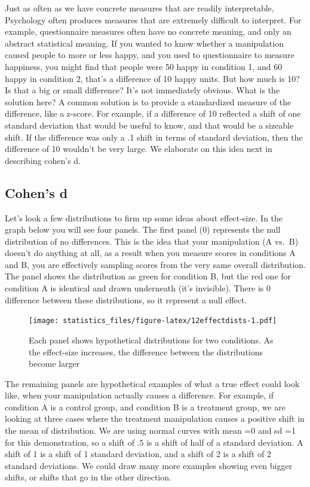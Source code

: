 \documentclass[]{book}
\begin{document}
Just as often as we have concrete measures that are readily interpretable, Psychology often produces measures that are extremely difficult to interpret. For example, questionnaire measures often have no concrete meaning, and only an abstract statistical meaning. If you wanted to know whether a manipulation caused people to more or less happy, and you used to questionnaire to measure happiness, you might find that people were 50 happy in condition 1, and 60 happy in condition 2, that's a difference of 10 happy units. But how much is 10? Is that a big or small difference? It's not immediately obvious. What is the solution here? A common solution is to provide a standardized measure of the difference, like a z-score. For example, if a difference of 10 reflected a shift of one standard deviation that would be useful to know, and that would be a sizeable shift. If the difference was only a .1 shift in terms of standard deviation, then the difference of 10 wouldn't be very large. We elaborate on this idea next in describing cohen's d.

\hypertarget{cohens-d}{%
\subsection{Cohen's d}\label{cohens-d}}

Let's look a few distributions to firm up some ideas about effect-size. In the graph below you will see four panels. The first panel (0) represents the null distribution of no differences. This is the idea that your manipulation (A vs.~B) doesn't do anything at all, as a result when you measure scores in conditions A and B, you are effectively sampling scores from the very same overall distribution. The panel shows the distribution as green for condition B, but the red one for condition A is identical and drawn underneath (it's invisible). There is 0 difference between these distributions, so it represent a null effect.

\begin{figure}
\centering
\texttt{[image: statistics\_files/figure-latex/12effectdists-1.pdf]}
\caption{\label{fig:12effectdists}Each panel shows hypothetical distributions for two conditions. As the effect-size increases, the difference between the distributions become larger}
\end{figure}

The remaining panels are hypothetical examples of what a true effect could look like, when your manipulation actually causes a difference. For example, if condition A is a control group, and condition B is a treatment group, we are looking at three cases where the treatment manipulation causes a positive shift in the mean of distribution. We are using normal curves with mean =0 and sd =1 for this demonstration, so a shift of .5 is a shift of half of a standard deviation. A shift of 1 is a shift of 1 standard deviation, and a shift of 2 is a shift of 2 standard deviations. We could draw many more examples showing even bigger shifts, or shifts that go in the other direction.
\end{document}

